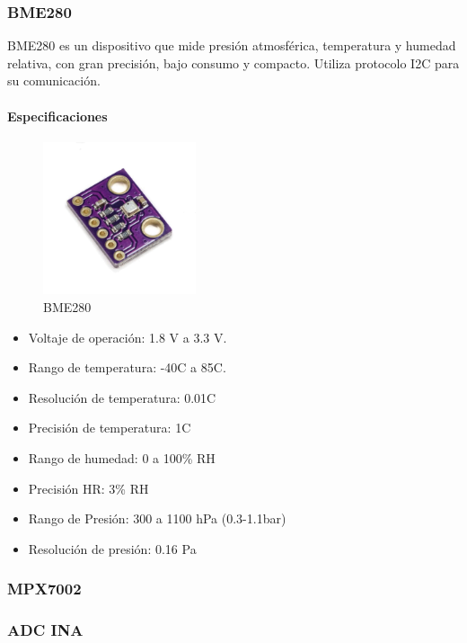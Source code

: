 	
	\subsubsection{BME280}
	BME280 es un dispositivo que mide presión atmosférica, temperatura y humedad relativa, con gran precisión, bajo consumo y compacto. Utiliza protocolo I2C para su comunicación.
	\paragraph*{Especificaciones}
	
	\begin{figure}[htb]
		\centering
		\includegraphics[width=0.4\textwidth]{bme280.png}
		\caption{BME280}
		\label{fig:BME280}
	\end{figure}
		
		\begin{itemize}
		\item   Voltaje de operación: 1.8 V a 3.3 V.
		\item	Rango de temperatura: -40\grad C a 85\grad C.
		\item   Resolución de temperatura: 0.01\grad C
		\item	Precisión de temperatura: 1\grad C 
		\item	Rango de humedad: 0 a 100\% RH
		\item   Precisión HR: 3\% RH
		\item Rango de Presión: 300 a 1100 hPa (0.3-1.1bar)
		\item Resolución de presión: 0.16 Pa
	\end{itemize}
	
	\subsubsection{MPX7002}
    \subsubsection{ADC INA}


